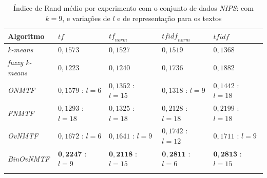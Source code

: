 \documentclass[
    12pt,                %
    oneside,            %
    a4paper,            %
    english,            %
    brazil                %
    ]{abntex2ppgsi}
\begin{document}
\begin{table}[H]
\centering
    \caption{Índice de Rand médio por experimento com o conjunto de dados \textit{NIPS}: com $k = 9$, e variações de $l$ e de representação para os textos}
    \begin{tabular}{lllll}
        \hline
        \textbf{Algoritmo}              & $\textit{tf}$ & $\textit{tf}_{norm}$ & $\textit{tfidf}_{norm}$ & $\textit{tfidf}$ \\
        \hline
        \textit{k-means}       & $0,1573$            & $0,1527$            & $0,1519$            & $0,1368$ \\
        \textit{fuzzy k-means} & $0,1223$            & $0,1240$            & $0,1736$            & $0,1882$ \\
        \textit{ONMTF}         & $0,1579$ : $l = 6$  & $0,1352$ : $l = 15$ & $0,1318$ : $l = 9$  & $0,1442$ : $l = 18$ \\
        \textit{FNMTF}         & $0,1293$ : $l = 18$ & $0,1325$ : $l = 18$ & $0,2128$ : $l = 18$ & $0,2199$ : $l = 18$ \\
        \textit{OvNMTF}        & $0,1672$ : $l = 6$  & $0,1641$ : $l = 9$  & $0,1742$ : $l = 12$ & $0,1711$ : $l = 9$ \\
        \textit{BinOvNMTF}     & $\mathbf{0,2247}$ : $l = 9$ & $\mathbf{0,2118}$ : $l = 15$ & $\mathbf{0,2811}$ : $l = 6$ & $\mathbf{0,2813}$ : $l = 15$ \\
        \hline \\
    \end{tabular}
    \label{tab:experiments-quant-rand:nips}
\end{table}
\end{document}
